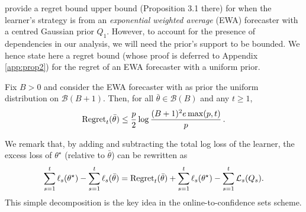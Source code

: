 \cite{clerico2025confidence} provide a regret bound upper bound (Proposition 3.1 there) for when the learner's strategy is from an \emph{exponential weighted average} (EWA) forecaster with a centred Gaussian prior $Q_1$. However, to account for the presence of dependencies in our analysis, we will need the prior's support to be bounded. We hence state here a regret bound (whose proof is deferred to Appendix \ref{app:prop2}) for the regret of an EWA forecaster with a uniform prior. %


\begin{prop}
Fix $B>0$ and consider the EWA forecaster with as prior the uniform distribution on $\mathcal B(B+1)$. Then, for all $\bar{\theta}\in\mathcal B(B)$ and any $t\geq 1$, %
\begin{equation*}
\mathrm{Regret}_t(\bar{\theta}) \leq \frac{p}{2}\log\frac{(B+1)^2e\max(p,t)}{p}\,.
\end{equation*}
\label{pro:uniform_ewa_regret}
\end{prop}

We remark that, by adding and subtracting the total log loss of the learner, the excess loss of $\theta^\star$ (relative to $\bar{\theta}$) can be rewritten as
\begin{equation}\label{eq:otc_dec}
\sum_{s=1}^t\ell_s(\theta^{\star}) - \sum_{s=1}^t\ell_s(\bar{\theta}) = \mathrm{Regret}_t(\bar{\theta}) + \sum_{s=1}^t\ell_s(\theta^{\star}) - \sum_{s=1}^{t}\mathcal{L}_s(Q_s).
\end{equation}
This simple decomposition is the key idea in the online-to-confidence sets scheme. 

